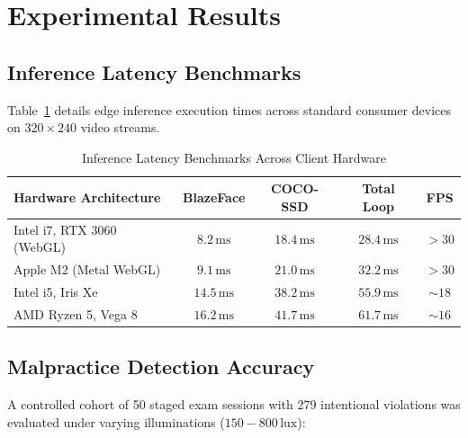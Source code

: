 \documentclass[conference]{IEEEtran}
\begin{document}
\section{Experimental Results}

\subsection{Inference Latency Benchmarks}
Table~\ref{tab:latency} details edge inference execution times across standard consumer devices on $320 \times 240$ video streams.

\begin{table}[htbp]
\caption{Inference Latency Benchmarks Across Client Hardware}
\begin{center}
\begin{tabular}{lcccc}
\toprule
\textbf{Hardware Architecture} & \textbf{BlazeFace} & \textbf{COCO-SSD} & \textbf{Total Loop} & \textbf{FPS} \\
\midrule
Intel i7, RTX 3060 (WebGL) & $8.2\,\text{ms}$ & $18.4\,\text{ms}$ & $28.4\,\text{ms}$ & $>30$ \\
Apple M2 (Metal WebGL)     & $9.1\,\text{ms}$ & $21.0\,\text{ms}$ & $32.2\,\text{ms}$ & $>30$ \\
Intel i5, Iris Xe          & $14.5\,\text{ms}$ & $38.2\,\text{ms}$ & $55.9\,\text{ms}$ & $\sim 18$ \\
AMD Ryzen 5, Vega 8        & $16.2\,\text{ms}$ & $41.7\,\text{ms}$ & $61.7\,\text{ms}$ & $\sim 16$ \\
\bottomrule
\end{tabular}
\label{tab:latency}
\end{center}
\end{table}

\subsection{Malpractice Detection Accuracy}
A controlled cohort of 50 staged exam sessions with 279 intentional violations was evaluated under varying illuminations ($150-800\,\text{lux}$):
\end{document}
